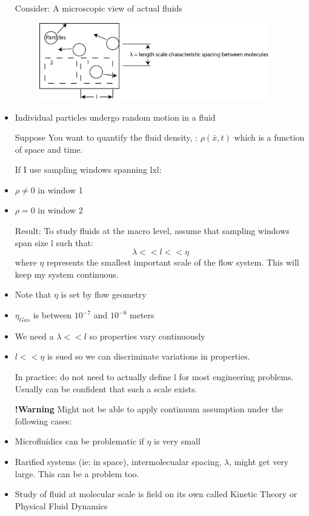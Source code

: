 \documentclass[12pt]{report}
\begin{document}
\begin{itemize}
\item[Consider:] A microscopic view of actual fluids
\begin{figure}[h]
\centering
\includegraphics[width=100mm]{MicroscopicFluidExampleME351A.jpg}
\end{figure}
\item Individual particles undergo random motion in a fluid
\item[Suppose] You want to quantify the fluid density, \textrho : $\rho(\bar{x},t) $ which is a function of space and time.

If I use sampling windows spanning lxl:
\item $\rho \neq 0 $ in window 1
\item $\rho = 0$ in window 2
\item[Result: ] To study fluids at the macro level, assume that sampling windows span size l such that:
\[\lambda<<l<<\eta\]
where $\eta$ represents the smallest important scale of the flow system. This will keep my system continuous.
\item Note that $\eta$ is set by flow geometry
\item $\eta_{Gas}$ is between $10^{-7}$ and $10^{-8}$ meters

\item We need a $\lambda<<l$ so properties vary continuously
\item $l<<\eta$ is sued so we can discriminate variations in properties.

\item[In practice: ] do not need to actually define l for most engineering problems. Usually can be confident that such a scale exists. 

\item[\textbf{!Warning}] Might not be able to apply continuum assumption under the following cases:
\item Microfluidics can be problematic if $\eta$ is very small
\item Rarified systems (ie: in space), intermolecualar spacing, $\lambda$, might get very large. This can be a problem too.
\item Study of fluid at molecular scale is field on its own called Kinetic Theory or Physical Fluid Dynamics

\end{itemize}
\end{document}
